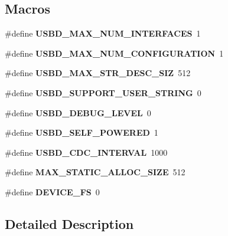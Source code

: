 \subsection*{Macros}
\begin{DoxyCompactItemize}
\item 
\mbox{\label{group___u_s_b_d___c_o_n_f___exported___defines_ga121d6d45e8011e1f372a365986126d0e}} 
\#define {\bfseries U\+S\+B\+D\+\_\+\+M\+A\+X\+\_\+\+N\+U\+M\+\_\+\+I\+N\+T\+E\+R\+F\+A\+C\+ES}~1
\item 
\mbox{\label{group___u_s_b_d___c_o_n_f___exported___defines_gaef1f76fda5677f5ad43c25a2ba4ebcde}} 
\#define {\bfseries U\+S\+B\+D\+\_\+\+M\+A\+X\+\_\+\+N\+U\+M\+\_\+\+C\+O\+N\+F\+I\+G\+U\+R\+A\+T\+I\+ON}~1
\item 
\mbox{\label{group___u_s_b_d___c_o_n_f___exported___defines_ga056ff3fee04cffde6a1ccccd566f8682}} 
\#define {\bfseries U\+S\+B\+D\+\_\+\+M\+A\+X\+\_\+\+S\+T\+R\+\_\+\+D\+E\+S\+C\+\_\+\+S\+IZ}~512
\item 
\mbox{\label{group___u_s_b_d___c_o_n_f___exported___defines_ga7763658489a8c680428bd017dcc38dfd}} 
\#define {\bfseries U\+S\+B\+D\+\_\+\+S\+U\+P\+P\+O\+R\+T\+\_\+\+U\+S\+E\+R\+\_\+\+S\+T\+R\+I\+NG}~0
\item 
\mbox{\label{group___u_s_b_d___c_o_n_f___exported___defines_gae7364a789408417d945d5ca96679ccf7}} 
\#define {\bfseries U\+S\+B\+D\+\_\+\+D\+E\+B\+U\+G\+\_\+\+L\+E\+V\+EL}~0
\item 
\mbox{\label{group___u_s_b_d___c_o_n_f___exported___defines_ga07065dc40f090f051dd1dd6d5901930a}} 
\#define {\bfseries U\+S\+B\+D\+\_\+\+S\+E\+L\+F\+\_\+\+P\+O\+W\+E\+R\+ED}~1
\item 
\mbox{\label{group___u_s_b_d___c_o_n_f___exported___defines_ga76c173c59319d963991209aec09f6f67}} 
\#define {\bfseries U\+S\+B\+D\+\_\+\+C\+D\+C\+\_\+\+I\+N\+T\+E\+R\+V\+AL}~1000
\item 
\mbox{\label{group___u_s_b_d___c_o_n_f___exported___defines_ga4fe01b36d47ddbccd412bcc9bddec5f3}} 
\#define {\bfseries M\+A\+X\+\_\+\+S\+T\+A\+T\+I\+C\+\_\+\+A\+L\+L\+O\+C\+\_\+\+S\+I\+ZE}~512
\item 
\mbox{\label{group___u_s_b_d___c_o_n_f___exported___defines_ga609db9b232fa154e9b1c86bcdd17e97c}} 
\#define {\bfseries D\+E\+V\+I\+C\+E\+\_\+\+FS}~0
\end{DoxyCompactItemize}


\subsection{Detailed Description}
